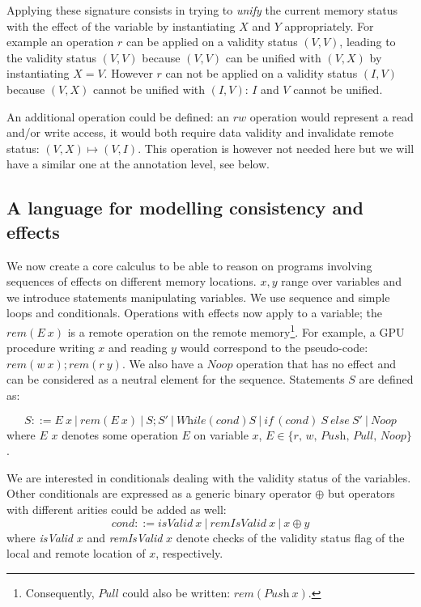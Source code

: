 \documentclass[preprint,12pt]{elsarticle}
\newcommand{\symb}[1]{\textit{#1}}
\newcommand{\noop}{\symb{Noop}}
\newcommand{\Push}{\symb{Push}}
\newcommand{\Pull}{\symb{Pull}}
\newcommand{\while}{\symb{While}}
\newcommand{\cond}{\symb{cond}}
\newcommand{\isvalid}{\symb{isValid}}
\newcommand{\isremvalid}{\symb{remIsValid}}
\newcommand{\rem}[1]{\symb{rem}(#1)}
\newcommand{\IF}[3]{\symb{if}\,(#1)~#2~\symb{else}~#3 }
\begin{document}
Applying these signature consists in trying to \emph{unify} the current memory status with the effect of the variable by instantiating $X$ and $Y$ appropriately. For example an operation $r$ can be applied on a validity status $(V,V)$, leading to the validity status $(V,V)$ because $(V,V)$ can be unified with $(V,X)$ by instantiating $X=V$. However $r$ can not be applied on a validity status $(I,V)$ because $(V,X)$ cannot be unified with $(I,V)$: $I$ and $V$ cannot be unified.

An additional operation could be defined: 
 an 
$rw$ operation would represent a read and/or write access, it would both require data 
validity and invalidate 
remote status: $(V,X)\mapsto (V,I)$. This operation is however not needed here but we will have a similar one at the annotation level, see below.

\subsection{A language for modelling consistency and effects}\label{sec-core}
We now create a core calculus to be able to reason on programs involving sequences of 
effects on different memory locations. $x,y$ range over variables and we introduce  statements manipulating 
variables. We use sequence and simple loops and conditionals. 
Operations with effects 
now apply to a variable;  the $\rem{E~x}$  is a remote operation 
 on the remote memory\footnote{Consequently, $\Pull$ could also be written: $\rem{\Push~x}$.}.  For example, a GPU procedure 
writing $x$ and reading $y$ would correspond to the pseudo-code: $\rem{w~x};\rem{r~y}$. We also have a $\noop$ operation that has no effect and can be considered as a neutral element for the sequence.
Statements $S$ are defined as:

{\small \[S::=E~x~|~\rem{E~x}~|~S;S'~|~\while(\cond) S ~|~ \IF{\cond}{S}{S'}~|~\noop\]}
\noindent{}where $E$ $x$ denotes some operation $E$ on variable $x$, $E\!\in\! \{r,\, w,\,  
\Push,\, \Pull,\, \noop\}$.

We are  interested  in conditionals dealing 
with the validity status of the variables. Other conditionals  are expressed as a generic 
binary operator $\oplus$ but  operators with different arities could be added as 
well:
\[\cond::=\isvalid~x~|~\isremvalid~x~|~x\oplus y\]
\noindent where \textit{isValid} $x$ and \textit{remIsValid} $x$ denote checks of the validity status flag of the local and remote location of $x$, respectively.
\end{document}
